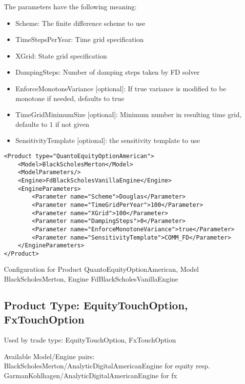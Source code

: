 The parameters have the following meaning:

\begin{itemize}
\item Scheme: The finite difference scheme to use
\item TimeStepsPerYear: Time grid specification
\item XGrid: State grid specification
\item DampingSteps: Number of damping steps taken by FD solver
\item EnforceMonotoneVariance [optional]: If true variance is modified to be monotone if needed, defaults to true
\item TimeGridMinimumSize [optional]: Minimum number in resulting time grid, defaults to $1$ if not given
\item SensitivityTemplate [optional]: the sensitivity template to use 
\end{itemize}

\begin{longlisting}
\begin{verbatim}
<Product type="QuantoEquityOptionAmerican">
    <Model>BlackScholesMerton</Model>
    <ModelParameters/>
    <Engine>FdBlackScholesVanillaEngine</Engine>
    <EngineParameters>
        <Parameter name="Scheme">Douglas</Parameter>
        <Parameter name="TimeGridPerYear">100</Parameter>
        <Parameter name="XGrid">100</Parameter>
        <Parameter name="DampingSteps">0</Parameter>
        <Parameter name="EnforceMonotoneVariance">true</Parameter>
        <Parameter name="SensitivityTemplate">COMM_FD</Parameter>
    </EngineParameters>
</Product>
\end{verbatim}
\caption{Configuration for Product QuantoEquityOptionAmerican, Model BlackScholesMerton, Engine FdBlackScholesVanillaEngine}
\label{lst:peconfig_EquityOptionAmerican_BlackScholesMerton_FdBlackScholesVanillaEngine}
\end{longlisting}

\subsection{Product Type: EquityTouchOption, FxTouchOption}

Used by trade type: EquityTouchOption, FxTouchOption

Available Model/Engine pairs: BlackScholesMerton/AnalyticDigitalAmericanEngine for equity
resp. GarmanKohlhagen/AnalyticDigitalAmericanEngine for fx

